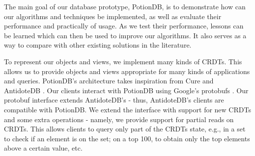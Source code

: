 
The main goal of our database prototype, PotionDB, is to demonstrate how can our algorithms and techniques be implemented, as well as evaluate their performance and practically of usage.
As we test their performance, lessons can be learned which can then be used to improve our algorithms.
It also serves as a way to compare with other existing solutions in the literature.

To represent our objects and views, we implement many kinds of CRDTs.
This allows us to provide objects and views appropriate for many kinds of applications and queries.
PotionDB's architecture takes inspiration from Cure \cite{???} and AntidoteDB \cite{???}.
Our clients interact with PotionDB using Google's protobufs \cite{???}.
Our protobuf interface extends AntidoteDB's - thus, AntidoteDB's clients are compatible with PotionDB.
We extend the interface with support for new CRDTs and some extra operations - namely, we provide support for partial reads on CRDTs.
This allows clients to query only part of the CRDTs state, e.g., in a set to check if an element is on the set; on a top 100, to obtain only the top elements above a certain value, etc.

